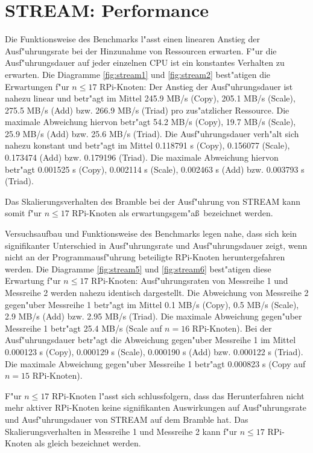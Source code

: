 \section{STREAM: Performance}\label{Interpretation-Stream}

Die Funktionsweise des Benchmarks l"asst einen linearen Anstieg der Ausf"uhrungsrate bei der Hinzunahme von Ressourcen erwarten. F"ur die Ausf"uhrungsdauer auf jeder einzelnen CPU ist ein konstantes Verhalten zu erwarten. Die Diagramme \ref{fig:stream1} und \ref{fig:stream2} best"atigen die Erwartungen f"ur $n\leq 17$ RPi-Knoten: Der Anstieg der Ausf"uhrungsdauer ist nahezu linear und betr"agt im Mittel 245.9 MB/s (Copy), 205.1 MB/s (Scale), 275.5 MB/s (Add) bzw. 266.9 MB/s (Triad) pro zus"atzlicher Ressource. Die maximale Abweichung hiervon betr"agt 54.2 MB/s (Copy), 19.7 MB/s (Scale), 25.9 MB/s (Add) bzw. 25.6 MB/s (Triad). Die Ausf"uhrungsdauer verh"alt sich nahezu konstant und betr"agt im Mittel 0.118791 s (Copy), 0.156077 (Scale), 0.173474 (Add) bzw. 0.179196 (Triad). Die maximale Abweichung hiervon betr"agt 0.001525 s (Copy), 0.002114 s (Scale), 0.002463 s (Add) bzw. 0.003793 s (Triad). 

Das Skalierungsverhalten des Bramble bei der Ausf"uhrung von STREAM kann somit f"ur $n\leq 17$ RPi-Knoten als erwartungsgem"a\ss\ bezeichnet werden. 

Versuchsaufbau und Funktionsweise des Benchmarks legen nahe, dass sich kein signifikanter Unterschied in Ausf"uhrungsrate und Ausf"uhrungsdauer zeigt, wenn nicht an der Programmausf"uhrung beteiligte RPi-Knoten heruntergefahren werden. Die Diagramme \ref{fig:stream5} und \ref{fig:stream6} best"atigen diese Erwartung f"ur $n\leq 17$ RPi-Knoten: Ausf"uhrungsraten von Messreihe 1 und Messreihe 2 werden nahezu identisch dargestellt. Die Abweichung von Messreihe 2 gegen"uber Messreihe 1 betr"agt im Mittel 0.1 MB/s (Copy), 0.5 MB/s (Scale), 2.9 MB/s (Add) bzw. 2.95 MB/s (Triad). Die maximale Abweichung gegen"uber Messreihe 1 betr"agt 25.4 MB/s (Scale auf $n=16$ RPi-Knoten). Bei der Ausf"uhrungsdauer betr"agt die Abweichung gegen"uber Messreihe 1 im Mittel 0.000123 s (Copy), 0.000129 s (Scale), 0.000190 s (Add) bzw. 0.000122 s (Triad). Die maximale Abweichung gegen"uber Messreihe 1 betr"agt 0.000823 s (Copy auf $n=15$ RPi-Knoten). 

F"ur $n\leq 17$ RPi-Knoten l"asst sich schlussfolgern, dass das Herunterfahren nicht mehr aktiver RPi-Knoten keine signifikanten Auswirkungen auf Ausf"uhrungsrate und Ausf"uhrungsdauer von STREAM auf dem Bramble hat. Das Skalierungsverhalten in Messreihe 1 und Messreihe 2 kann f"ur $n\leq 17$ RPi-Knoten als gleich bezeichnet werden.

